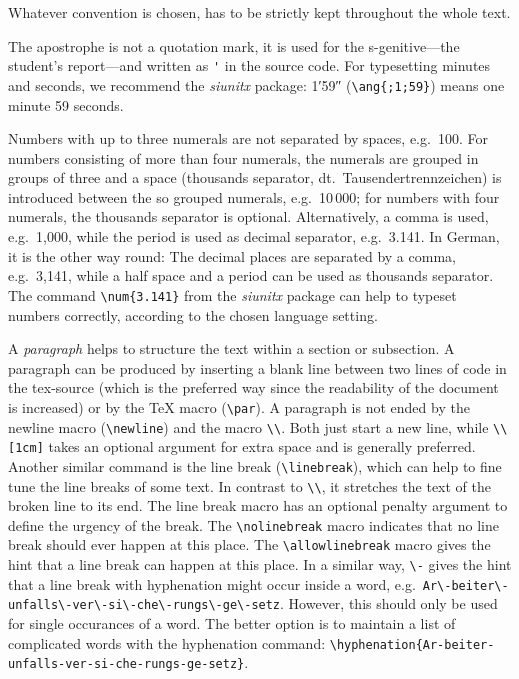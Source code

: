 Whatever convention is chosen, has to be strictly kept throughout the whole text. 

The apostrophe is not a quotation mark, it is used for the s-genitive---the student's report---and written as \verb|'| in the source code. 
For typesetting minutes and seconds, we recommend the \emph{siunitx} package: 
\ang{;1;59} (\verb|\ang{;1;59}|) means one minute 59 seconds. 

Numbers with up to three numerals are not separated by spaces, e.g.\ \num{100}. 
For numbers consisting of more than four numerals, the numerals are grouped in groups of three and a space (thousands separator, dt.\ Tausendertrennzeichen) is introduced between the so grouped numerals, e.g.\ 10\,000; for numbers with four numerals, the thousands separator is optional. 
Alternatively, a comma is used, e.g.\ 1,000, while the period is used as decimal separator, e.g.\ \num{3.141}.
In German, it is the other way round: The decimal places are separated by a comma, e.g.\ 3,141, while a half space and a period can be used as thousands separator.
The command \verb|\num{3.141}| from the \emph{siunitx} package can help to typeset numbers correctly, according to the chosen language setting. 

A \emph{paragraph} helps to structure the text within a section or subsection. 
A paragraph can be produced by inserting a blank line between two lines of code in the tex-source (which is the preferred way since the readability of the document is increased) or by the TeX macro (\verb|\par|). 
A paragraph is not ended by the newline macro  (\verb|\newline|) and the macro \verb|\\|. 
Both just start a new line, while \verb|\\[1cm]| takes an optional argument for extra space and is generally preferred. 
Another similar command is the line break (\verb|\linebreak|), which can help to fine tune the line breaks of some text. 
In contrast to \verb|\\|, it stretches the text of the broken line to its end. 
The line break macro has an optional penalty argument to define the urgency of the break. 
The \verb|\nolinebreak| macro indicates that no line break should ever happen at this place. 
The \verb|\allowlinebreak| macro gives the hint that a line break can happen at this place. 
In a similar way, \verb|\-| gives the hint that a line break with hyphenation might occur inside a word, e.g.\ \verb|Ar\-beiter\-unfalls\-ver\-si\-che\-rungs\-ge\-setz|. 
However, this should only be used for single occurances of a word. The better option is to maintain a list of complicated words with the hyphenation command: \verb|\hyphenation{Ar-beiter-unfalls-ver-si-che-rungs-ge-setz}|.


